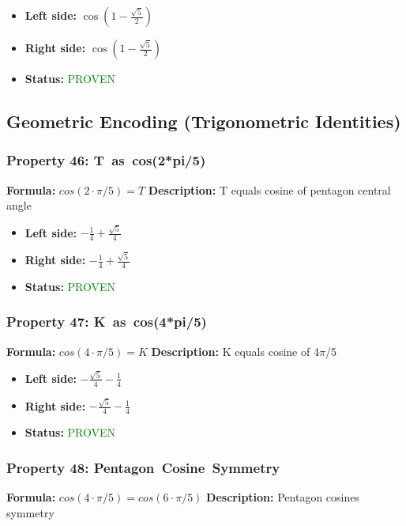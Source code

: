 \begin{itemize}
\item \textbf{Left side:} $\cos{\left(1 - \frac{\sqrt{5}}{2} \right)}$
\item \textbf{Right side:} $\cos{\left(1 - \frac{\sqrt{5}}{2} \right)}$
\item \textbf{Status:} \textcolor{green}{PROVEN}
\end{itemize}


\subsection{Geometric Encoding (Trigonometric Identities)}

\subsubsection*{Property 46: T~as~cos(2*pi/5)}
\textbf{Formula:} $cos(2 \cdot \pi/5) = T$
\textbf{Description:} T equals cosine of pentagon central angle

\begin{itemize}
\item \textbf{Left side:} $- \frac{1}{4} + \frac{\sqrt{5}}{4}$
\item \textbf{Right side:} $- \frac{1}{4} + \frac{\sqrt{5}}{4}$
\item \textbf{Status:} \textcolor{green}{PROVEN}
\end{itemize}

\subsubsection*{Property 47: K~as~cos(4*pi/5)}
\textbf{Formula:} $cos(4 \cdot \pi/5) = K$
\textbf{Description:} K equals cosine of 4$\pi$/5

\begin{itemize}
\item \textbf{Left side:} $- \frac{\sqrt{5}}{4} - \frac{1}{4}$
\item \textbf{Right side:} $- \frac{\sqrt{5}}{4} - \frac{1}{4}$
\item \textbf{Status:} \textcolor{green}{PROVEN}
\end{itemize}

\subsubsection*{Property 48: Pentagon~Cosine~Symmetry}
\textbf{Formula:} $cos(4 \cdot \pi/5) = cos(6 \cdot \pi/5)$
\textbf{Description:} Pentagon cosines symmetry

